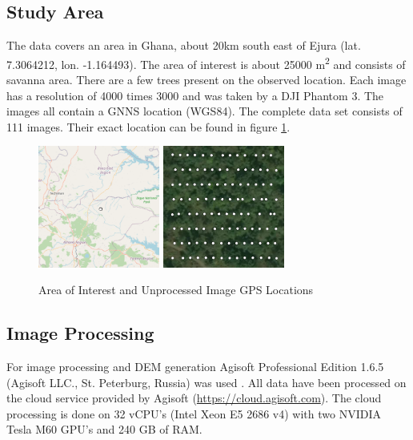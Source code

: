 \documentclass{isprs} %
\begin{document}
\subsection{Study Area}\label{sec:Study Area}
The data covers an area in Ghana, about 20km south east of Ejura (lat. 7.3064212, lon. -1.164493). 
The area of interest is about 25000 m\textsuperscript{2} and consists of savanna area.
There are a few trees present on the observed location.
Each image has a resolution of 4000 times 3000 and was taken by a DJI Phantom 3.
The images all contain a GNNS location (WGS84). 
The complete data set consists of 111 images.
Their exact location can be found in figure \ref{fig:areaofinterest}.
\begin{figure}[h]
    \centering
    \includegraphics[width=4cm]{locationwide.png}
    \includegraphics[width=4cm]{imgloc.png}
    \caption{Area of Interest and Unprocessed Image GPS Locations}
    \label{fig:areaofinterest}
\end{figure}


\subsection{Image Processing}
For image processing and DEM generation Agisoft Professional Edition 1.6.5 (Agisoft LLC., St. Peterburg, Russia) was used \citep{AgisoftMetashape}.
All data have been processed on the cloud service provided by Agisoft (\url{https://cloud.agisoft.com}).
The cloud processing is done on 32 vCPU's (Intel Xeon E5 2686 v4) with two NVIDIA Tesla M60 GPU's and 240 GB of RAM.
\end{document}
